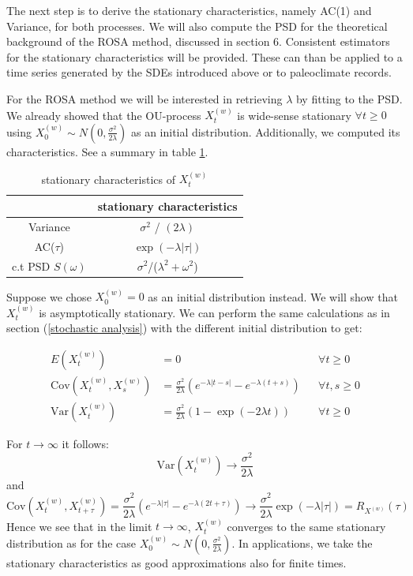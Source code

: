 \documentclass[%
thesis=student,%
coverpage=false,%
titlepage=false,%
headmarks=true, %
english,%
font=libertine, %
math=newpxtx, %
BCOR=5mm,%
coverBCOR=11mm%
]{tumbook}
\begin{document}
The next step is to derive the stationary characteristics, namely AC(1) and Variance, for both processes. We will also compute the PSD for the theoretical background of the ROSA method, discussed in section 6. Consistent estimators for the stationary characteristics will be provided. These can than be applied to a time series generated by the SDEs introduced above or to paleoclimate records. 

For the ROSA method we will be interested in retrieving $\lambda$ by fitting to the PSD. We already showed that the OU-process $X_{t}^{(w)}$ is wide-sense stationary $\forall t \geq 0$ using $X_{0}^{(w)} \sim N(0,\frac{\sigma^2}{2\lambda})$ as an initial distribution. Additionally, we computed its characteristics. See a summary in table \ref{tab:white_noise_stat_char}. 


\begin{table}[t]
\centering
\begin{tabular}{|c|c|}
\hline
& stationary characteristics\\
\hline
Variance & $\sigma^2$ / $(2\lambda)$\\
AC($\tau$) & $\exp(-\lambda |\tau|)$\\
c.t PSD $S(\omega)$ & $\sigma^2$/($\lambda^2 + \omega^2$)\\
\hline
\end{tabular}
\caption{stationary characteristics of $X_{t}^{(w)}$}
\label{tab:white_noise_stat_char}
\end{table}

Suppose we chose $X_{0}^{(w)} = 0$ as an initial distribution instead. We will show that $X_{t}^{(w)}$ is asymptotically stationary. We can perform the same calculations as in section (\ref{stochastic analysis}) with the different initial distribution to get:

 \begin{align*}
    E(X_{t}^{(w)}) &= 0   && \forall t \geq 0 \\
    \text{Cov}(X_{t}^{(w)},X_{s}^{(w)}) &= \frac{\sigma ^2}{2\lambda}(e^{-\lambda\lvert t-s \rvert}-e^{-\lambda(t+s)}) && \forall t, s \geq 0 \\
    \text{Var}(X_{t}^{(w)}) &= \frac{\sigma^2}{2\lambda}(1-\exp(-2\lambda t)) && \forall t \geq 0 
\end{align*}

For $t\rightarrow \infty$ it follows: 
\[
\text{Var}(X_{t}^{(w)})\rightarrow\frac{\sigma^2}{2\lambda}
\]
and 
\[
\text{Cov}(X_{t}^{(w)},X_{t+\tau}^{(w)}) = \frac{\sigma^2}{2\lambda}(e^{-\lambda\lvert \tau \rvert} - e^{-\lambda(2t + \tau)}) \rightarrow \frac{\sigma ^2}{2\lambda}\exp(-\lambda\lvert \tau \rvert) = R_{X^{(w)}}(\tau)
\]
Hence we see that in the limit $t\rightarrow \infty$, $X_{t}^{(w)}$ converges to the same stationary distribution as for the case $X_{0}^{(w)} \sim N(0,\frac{\sigma^2}{2\lambda})$. 
In applications, we take the stationary characteristics as good approximations also for finite times.
\end{document}

